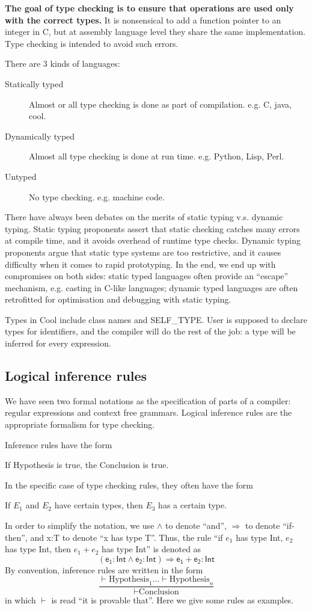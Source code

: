 {\bf The goal of type checking is to ensure that operations are used only with the correct types. }It is nonsensical to add a function pointer to an integer in C, but at assembly language level they share the same implementation. Type checking is intended to avoid such errors.

There are 3 kinds of languages: 
\begin{description}
\item[Statically typed]Almost or all type checking is done as part of compilation. e.g. C, java, cool.
\item[Dynamically typed]Almost all type checking is done at run time. e.g. Python, Lisp, Perl.
\item[Untyped]No type checking. e.g. machine code.
\end{description}
There have always been debates on the merits of static typing v.s. dynamic typing. Static typing proponents assert that static checking catches many errors at compile time, and it avoids overhead of runtime type checks. Dynamic typing proponents argue that static type systems are too restrictive, and it causes difficulty when it comes to rapid prototyping. In the end, we end up with compromises on both sides: static typed languages often provide an ``escape'' mechanism, e.g. casting in C-like languages; dynamic typed languages are often retrofitted for optimisation and debugging with static typing. 

Types in Cool include class names and SELF\_TYPE. User is supposed to declare types for identifiers, and the compiler will do the rest of the job: a type will be inferred for every expression. 
\subsection{Logical inference rules}
We have seen two formal notations as the specification of parts of a compiler: regular expressions and context free grammars. Logical inference rules are the appropriate formalism for type checking. 

Inference rules have the form
\begin{center}
If Hypothesis is true, the Conclusion is true. 
\end{center}
In the specific case of type checking rules, they often have the form
\begin{center}
If $E_1$ and $E_2$ have certain types, then $E_3$ has a certain type. 
\end{center}
In order to simplify the notation, we use $\land$ to denote ``and'', $\Rightarrow$ to denote ``if-then'', and x:T to denote ``x has type T''. Thus, the rule ``if $e_1$ has type Int, $e_2$ has type Int, then $e_1+e_2$ has type Int'' is denoted as 
\begin{equation*}
\mathsf{(e_1:Int\land e_2:Int)\Rightarrow e_1+e_2:Int}
\end{equation*}
By convention, inference rules are written in the form
\begin{equation*}
\frac{\vdash\text{Hypothesis}_1\dots\vdash\text{Hypothesis}_n}{\vdash\text{Conclusion}}
\end{equation*}
in which $\vdash$ is read ``it is provable that''. Here we give some rules as examples.

